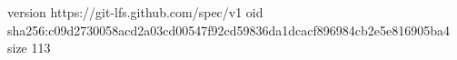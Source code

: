 version https://git-lfs.github.com/spec/v1
oid sha256:c09d2730058acd2a03cd00547f92cd59836da1dcacf896984cb2e5e816905ba4
size 113
